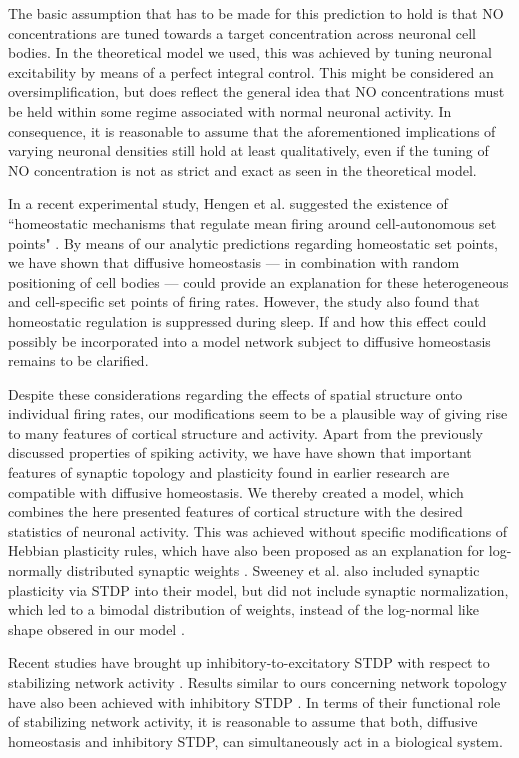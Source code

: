 \documentclass[10pt,letterpaper]{article}
\begin{document}
The basic assumption that has to be made for this prediction to hold is that NO concentrations are tuned towards a target concentration across neuronal cell bodies. In the theoretical model we used, this was achieved by tuning neuronal excitability by means of a perfect integral control. This might be considered an oversimplification, but does reflect the general idea that NO concentrations must be held within some regime associated with normal neuronal activity. In consequence, it is reasonable to assume that the aforementioned implications of varying neuronal densities still hold at least qualitatively, even if the tuning of NO concentration is not as strict and exact as seen in the theoretical model.



In a recent experimental study, Hengen et al. suggested the existence of ``homeostatic mechanisms that regulate mean firing around cell-autonomous set points" \cite{Hengen_2016}. By means of our analytic predictions regarding homeostatic set points, we have shown that diffusive homeostasis --- in combination with random positioning of cell bodies --- could provide an explanation for these heterogeneous and cell-specific set points of firing rates. However, the study also found that homeostatic regulation is suppressed during sleep. If and how this effect could possibly be incorporated into a model network subject to diffusive homeostasis remains to be clarified.

Despite these considerations regarding the effects of spatial structure onto individual firing rates, our modifications seem to be a plausible way of giving rise to many features of cortical structure and activity. Apart from the previously discussed properties of spiking activity, we have have shown that important features of synaptic topology and plasticity found in earlier research are compatible with diffusive homeostasis. We thereby created a model, which combines the here presented features of cortical structure with the desired statistics of neuronal activity. This was achieved without specific modifications of Hebbian plasticity rules, which have also been proposed as an explanation for log-normally distributed synaptic weights \cite{Koulakov_2009,Gilson_2011,Effenberger_2015}. Sweeney et al. also included synaptic plasticity via STDP into their model, but did not include synaptic normalization, which led to a bimodal distribution of weights, instead of the log-normal like shape obsered in our model \cite{Sweeney_Paper}.

Recent studies have brought up inhibitory-to-excitatory STDP with respect to stabilizing network activity \cite{Vogels_2011,Luz_2012}. Results similar to ours concerning network topology have also been achieved with inhibitory STDP \cite{Effenberger_2015}. In terms of their functional role of stabilizing network activity, it is reasonable to assume that both, diffusive homeostasis and inhibitory STDP, can simultaneously act in a biological system.
\end{document}
